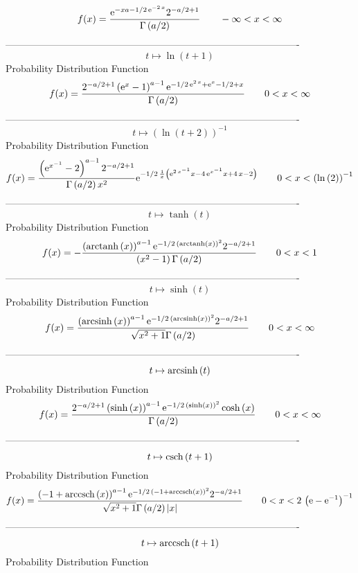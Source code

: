 \documentclass[12pt]{article}
\begin{document}
$$  f(x)={\frac {{{\rm e}^{-xa-1/2\,{{\rm e}^{-2\,x}}}}{2}^{-a/2+1}}{\Gamma
 \left( a/2 \right) }}
 \qquad-\infty 
 < x < \infty 
$$-------------------------------------------------------------------------------------------  \\$$t\mapsto \ln  \left( t+1 \right) 
$$Probability Distribution Function 
$$  f(x)={\frac {{2}^{-a/2+1} \left( {{\rm e}^{x}}-1 \right) ^{a-1}{{\rm e}^{-1
/2\,{{\rm e}^{2\,x}}+{{\rm e}^{x}}-1/2+x}}}{\Gamma \left( a/2 \right) 
}}
 \qquad0
 < x < \infty 
$$-------------------------------------------------------------------------------------------  \\$$t\mapsto  \left( \ln  \left( t+2 \right)  \right) ^{-1}
$$Probability Distribution Function 
$$  f(x)={\frac { \left( {{\rm e}^{{x}^{-1}}}-2 \right) ^{a-1}{2}^{-a/2+1}}{
\Gamma \left( a/2 \right) {x}^{2}}{{\rm e}^{-1/2\,{\frac {1}{x}
 \left( {{\rm e}^{2\,{x}^{-1}}}x-4\,{{\rm e}^{{x}^{-1}}}x+4\,x-2
 \right) }}}}
 \qquad0
 < x <  \left( \ln  \left( 2 \right)  \right) ^{-1}
$$-------------------------------------------------------------------------------------------  \\$$t\mapsto \tanh \left( t \right) 
$$Probability Distribution Function 
$$  f(x)=-{\frac { \left( {\rm arctanh} \left(x\right) \right) ^{a-1}{{\rm e}^{
-1/2\, \left( {\rm arctanh} \left(x\right) \right) ^{2}}}{2}^{-a/2+1}
}{ \left( {x}^{2}-1 \right) \Gamma \left( a/2 \right) }}
 \qquad0
 < x < 1
$$-------------------------------------------------------------------------------------------  \\$$t\mapsto \sinh \left( t \right) 
$$Probability Distribution Function 
$$  f(x)={\frac { \left( {\rm arcsinh} \left(x\right) \right) ^{a-1}{{\rm e}^{-
1/2\, \left( {\rm arcsinh} \left(x\right) \right) ^{2}}}{2}^{-a/2+1}}{
\sqrt {{x}^{2}+1}\Gamma \left( a/2 \right) }}
 \qquad0
 < x < \infty 
$$-------------------------------------------------------------------------------------------  \\$$t\mapsto {\rm arcsinh} \left(t\right)
$$Probability Distribution Function 
$$  f(x)={\frac {{2}^{-a/2+1} \left( \sinh \left( x \right)  \right) ^{a-1}{
{\rm e}^{-1/2\, \left( \sinh \left( x \right)  \right) ^{2}}}\cosh
 \left( x \right) }{\Gamma \left( a/2 \right) }}
 \qquad0
 < x < \infty 
$$-------------------------------------------------------------------------------------------  \\$$t\mapsto {\rm csch} \left(t+1\right)
$$Probability Distribution Function 
$$  f(x)={\frac { \left( -1+{\rm arccsch} \left(x\right) \right) ^{a-1}{{\rm e}
^{-1/2\, \left( -1+{\rm arccsch} \left(x\right) \right) ^{2}}}{2}^{-a/
2+1}}{\sqrt {{x}^{2}+1}\Gamma \left( a/2 \right)  \left| x \right| }}
 \qquad0
 < x < 2\, \left( {\rm e}-{{\rm e}^{-1}} \right) ^{-1}
$$-------------------------------------------------------------------------------------------  \\$$t\mapsto {\rm arccsch} \left(t+1\right)
$$Probability Distribution Function 
\end{document}
